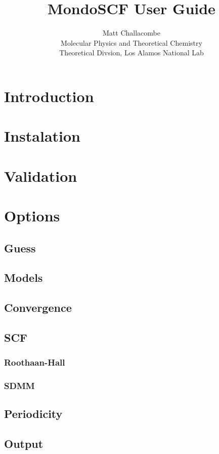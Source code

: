 \documentclass[titlepage,12pt,twoside]{report}
\begin{document}
\title{\Huge{\textsf{\textbf{MondoSCF}}} User Guide}
\author{Matt Challacombe\\
        Molecular Physics and Theoretical Chemistry\\
        Theoretical Divsion, Los Alamos National Lab}
\maketitle
\section{Introduction}
\section{Instalation}
\section{Validation}
\section{Options}
\subsection{Guess}
\subsection{Models}
\subsection{Convergence}
\subsection{SCF}
\subsubsection{Roothaan-Hall}
\subsubsection{SDMM}
\subsection{Periodicity}
\subsection{Output}
\end{document}
